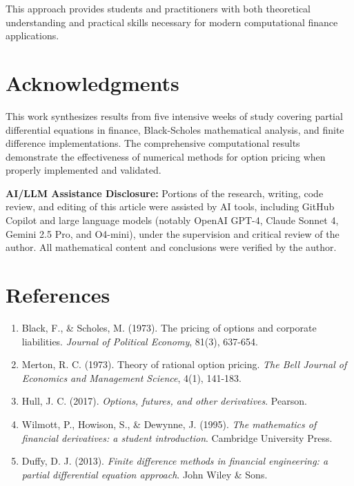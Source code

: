 \documentclass[12pt,a4paper]{article}
\numberwithin{algorithm}{subsection}
\begin{document}
This approach provides students and practitioners with both theoretical understanding and practical skills necessary for modern computational finance applications.

\section*{Acknowledgments}

This work synthesizes results from five intensive weeks of study covering partial differential equations in finance, Black-Scholes mathematical analysis, and finite difference implementations. The comprehensive computational results demonstrate the effectiveness of numerical methods for option pricing when properly implemented and validated.

\textbf{AI/LLM Assistance Disclosure:} Portions of the research, writing, code review, and editing of this article were assisted by AI tools, including GitHub Copilot and large language models (notably OpenAI GPT-4, Claude Sonnet 4, Gemini 2.5 Pro, and O4-mini), under the supervision and critical review of the author. All mathematical content and conclusions were verified by the author.

\section*{References}

\begin{enumerate}
\item Black, F., \& Scholes, M. (1973). The pricing of options and corporate liabilities. \textit{Journal of Political Economy}, 81(3), 637-654.
\item Merton, R. C. (1973). Theory of rational option pricing. \textit{The Bell Journal of Economics and Management Science}, 4(1), 141-183.
\item Hull, J. C. (2017). \textit{Options, futures, and other derivatives}. Pearson.
\item Wilmott, P., Howison, S., \& Dewynne, J. (1995). \textit{The mathematics of financial derivatives: a student introduction}. Cambridge University Press.
\item Duffy, D. J. (2013). \textit{Finite difference methods in financial engineering: a partial differential equation approach}. John Wiley \& Sons.
\end{enumerate}
\end{document}
